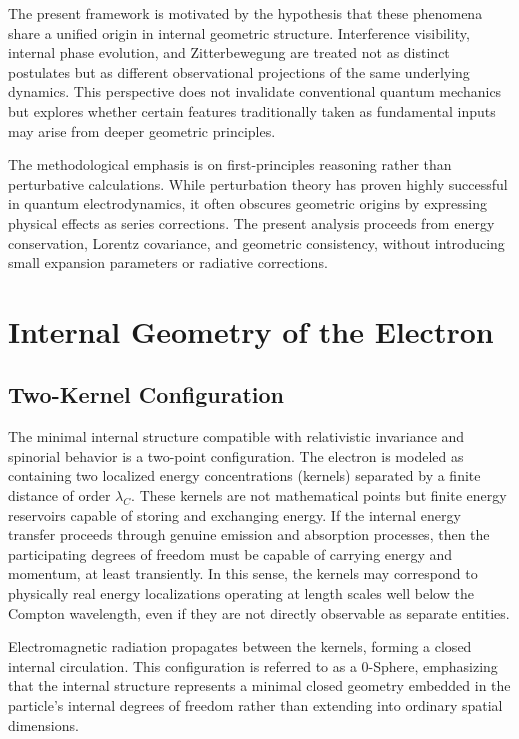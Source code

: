 \documentclass[%
 reprint,
 amsmath,amssymb,
 aps,
 prb,
]{revtex4-2}
\numberwithin{equation}{section}
\begin{document}
The present framework is motivated by the hypothesis that these phenomena share a unified origin in internal geometric structure. Interference visibility, internal phase evolution, and Zitterbewegung are treated not as distinct postulates but as different observational projections of the same underlying dynamics. This perspective does not invalidate conventional quantum mechanics but explores whether certain features traditionally taken as fundamental inputs may arise from deeper geometric principles.

The methodological emphasis is on first-principles reasoning rather than perturbative calculations. While perturbation theory has proven highly successful in quantum electrodynamics, it often obscures geometric origins by expressing physical effects as series corrections. The present analysis proceeds from energy conservation, Lorentz covariance, and geometric consistency, without introducing small expansion parameters or radiative corrections.


\section{Internal Geometry of the Electron}
\label{sec:internal_geometry}


\subsection{Two-Kernel Configuration}
\label{subsec:two_kernel}

The minimal internal structure compatible with relativistic invariance and spinorial behavior is a two-point configuration. The electron is modeled as containing two localized energy concentrations (kernels) separated by a finite distance of order $\lambda_C$. These kernels are not mathematical points but finite energy reservoirs capable of storing and exchanging energy. If the internal energy transfer proceeds through genuine emission and absorption processes, then the participating degrees of freedom must be capable of carrying energy and momentum, at least transiently. In this sense, the kernels may correspond to physically real energy localizations operating at length scales well below the Compton wavelength, even if they are not directly observable as separate entities.

Electromagnetic radiation propagates between the kernels, forming a closed internal circulation. This configuration is referred to as a 0-Sphere, emphasizing that the internal structure represents a minimal closed geometry embedded in the particle's internal degrees of freedom rather than extending into ordinary spatial dimensions.
\end{document}
